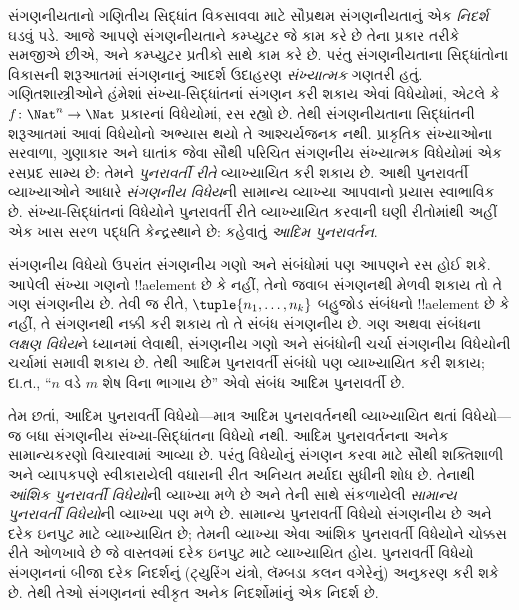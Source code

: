 \documentclass[../../../include/open-logic-section]{subfiles}
\begin{document}

સંગણનીયતાનો ગણિતીય સિદ્ધાંત વિકસાવવા માટે સૌપ્રથમ સંગણનીયતાનું એક
\emph{નિદર્શ} ઘડવું પડે. આજે આપણે સંગણનીયતાને કમ્પ્યુટર જે કામ કરે છે
તેના પ્રકાર તરીકે સમજીએ છીએ, અને કમ્પ્યુટર પ્રતીકો સાથે કામ કરે છે. પરંતુ
સંગણનીયતાના સિદ્ધાંતોના વિકાસની શરૂઆતમાં સંગણનાનું આદર્શ ઉદાહરણ
\emph{સંખ્યાત્મક} ગણતરી હતું. ગણિતશાસ્ત્રીઓને હંમેશાં સંખ્યા-સિદ્ધાંતનાં
સંગણન કરી શકાય એવાં વિધેયોમાં, એટલે કે $f\colon \Nat^n \to \Nat$
પ્રકારનાં વિધેયોમાં, રસ રહ્યો છે. તેથી સંગણનીયતાના સિદ્ધાંતની શરૂઆતમાં
આવાં વિધેયોનો અભ્યાસ થયો તે આશ્ચર્યજનક નથી. પ્રાકૃતિક સંખ્યાઓના સરવાળા,
ગુણાકાર અને ઘાતાંક જેવા સૌથી પરિચિત સંગણનીય સંખ્યાત્મક વિધેયોમાં એક
રસપ્રદ સામ્ય છે: તેમને \emph{પુનરાવર્તી રીતે} વ્યાખ્યાયિત કરી શકાય છે.
આથી પુનરાવર્તી વ્યાખ્યાઓને આધારે \emph{સંગણનીય વિધેય}ની સામાન્ય વ્યાખ્યા
આપવાનો પ્રયાસ સ્વાભાવિક છે. સંખ્યા-સિદ્ધાંતનાં વિધેયોને પુનરાવર્તી રીતે
વ્યાખ્યાયિત કરવાની ઘણી રીતોમાંથી અહીં એક ખાસ સરળ પદ્ધતિ કેન્દ્રસ્થાને
છે: કહેવાતું \emph{આદિમ પુનરાવર્તન}.

સંગણનીય વિધેયો ઉપરાંત સંગણનીય ગણો અને સંબંધોમાં પણ આપણને રસ હોઈ શકે.
આપેલી સંખ્યા ગણનો !!a{element} છે કે નહીં, તેનો જવાબ સંગણનથી મેળવી
શકાય તો તે ગણ સંગણનીય છે. તેવી જ રીતે, $\tuple{n_1, \dots, n_k}$
બહુજોડ સંબંધનો !!a{element} છે કે નહીં, તે સંગણનથી નક્કી કરી શકાય તો
તે સંબંધ સંગણનીય છે. ગણ અથવા સંબંધના \emph{લક્ષણ વિધેય}ને ધ્યાનમાં
લેવાથી, સંગણનીય ગણો અને સંબંધોની ચર્ચા સંગણનીય વિધેયોની ચર્ચામાં
સમાવી શકાય છે. તેથી આદિમ પુનરાવર્તી સંબંધો પણ વ્યાખ્યાયિત કરી શકાય;
દા.ત., ``$n$ વડે $m$ શેષ વિના ભાગાય છે'' એવો સંબંધ આદિમ પુનરાવર્તી છે.

તેમ છતાં, આદિમ પુનરાવર્તી વિધેયો---માત્ર આદિમ પુનરાવર્તનથી વ્યાખ્યાયિત
થતાં વિધેયો---જ બધા સંગણનીય સંખ્યા-સિદ્ધાંતના વિધેયો નથી. આદિમ
પુનરાવર્તનના અનેક સામાન્યકરણો વિચારવામાં આવ્યા છે. પરંતુ વિધેયોનું
સંગણન કરવા માટે સૌથી શક્તિશાળી અને વ્યાપકપણે સ્વીકારાયેલી વધારાની રીત
અનિયત મર્યાદા સુધીની શોધ છે. તેનાથી \emph{આંશિક પુનરાવર્તી વિધેયો}ની
વ્યાખ્યા મળે છે અને તેની સાથે સંકળાયેલી \emph{સામાન્ય પુનરાવર્તી
વિધેયો}ની વ્યાખ્યા પણ મળે છે. સામાન્ય પુનરાવર્તી વિધેયો સંગણનીય છે
અને દરેક ઇનપુટ માટે વ્યાખ્યાયિત છે; તેમની વ્યાખ્યા એવા આંશિક
પુનરાવર્તી વિધેયોને ચોક્કસ રીતે ઓળખાવે છે જે વાસ્તવમાં દરેક ઇનપુટ માટે
વ્યાખ્યાયિત હોય. પુનરાવર્તી વિધેયો સંગણનનાં બીજા દરેક નિદર્શનું
(ટ્યુરિંગ યંત્રો, લૅમ્બડા કલન વગેરેનું) અનુકરણ કરી શકે છે. તેથી તેઓ
સંગણનનાં સ્વીકૃત અનેક નિદર્શોમાંનું એક નિદર્શ છે.
\end{document}
